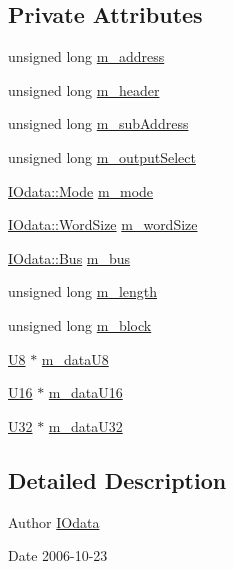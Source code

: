\subsection*{Private Attributes}
\begin{DoxyCompactItemize}
\item 
unsigned long \hyperlink{classIOdata_a965810e1888b904c575277f50cea734a}{m\_\-address}
\item 
unsigned long \hyperlink{classIOdata_a46ec7dbfa257c02be1d39c4799f157d3}{m\_\-header}
\item 
unsigned long \hyperlink{classIOdata_a562f84e5cace1e392f1b0fca553fff78}{m\_\-subAddress}
\item 
unsigned long \hyperlink{classIOdata_acc46d71243b542e68277e242effa7f1b}{m\_\-outputSelect}
\item 
\hyperlink{classIOdata_a044e9a4a0c6d25a43ebfe29c4fa4f1e5}{IOdata::Mode} \hyperlink{classIOdata_a0782e31763fa855f1ecbd377dce538e6}{m\_\-mode}
\item 
\hyperlink{classIOdata_a37c53ebf4bf8d866aac8af572962a84c}{IOdata::WordSize} \hyperlink{classIOdata_a719b0ce607ada4fa91b12d6ecfa1b4c9}{m\_\-wordSize}
\item 
\hyperlink{classIOdata_a99aa7bed39364c4359ab8a7596bc013c}{IOdata::Bus} \hyperlink{classIOdata_a42c07a9b3f43ec35dd18d13a67d294cc}{m\_\-bus}
\item 
unsigned long \hyperlink{classIOdata_afabe57441da019eb614d277799106aac}{m\_\-length}
\item 
unsigned long \hyperlink{classIOdata_a6d1ce9f88db6b97ce61098a3693e253f}{m\_\-block}
\item 
\hyperlink{classIOdata_a18d1354b7cdaf0f8a8001fdbb3ced418}{U8} $\ast$ \hyperlink{classIOdata_a9c4c0dc5104f7f3b170e30ab78fe61e7}{m\_\-dataU8}
\item 
\hyperlink{classIOdata_a1eb45b348534a7c19a4a99b746e693ff}{U16} $\ast$ \hyperlink{classIOdata_a8d698e077b7898009691b9086a3e6453}{m\_\-dataU16}
\item 
\hyperlink{classIOdata_a96fb57f5fcd87b708743abd3c86a5198}{U32} $\ast$ \hyperlink{classIOdata_a247cdaefd87084e3cad1d530d592d99a}{m\_\-dataU32}
\end{DoxyCompactItemize}


\subsection{Detailed Description}
\begin{DoxyAuthor}{Author}
\hyperlink{classIOdata}{IOdata} 
\end{DoxyAuthor}
\begin{DoxyDate}{Date}
2006-\/10-\/23 
\end{DoxyDate}


